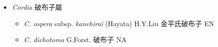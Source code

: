 
  \begin{itemize}
 \item[] \textit{Cordia} 破布子屬
                                
  \begin{itemize}
        \item[] \textit{C. aspera} subsp. \textit{kanehirai} (Hayata) H.Y.Liu  金平氏破布子   EN
        \item[] \textit{C. dichotoma} G.Forst.  破布子   NA
  \end{itemize}
  \end{itemize}
